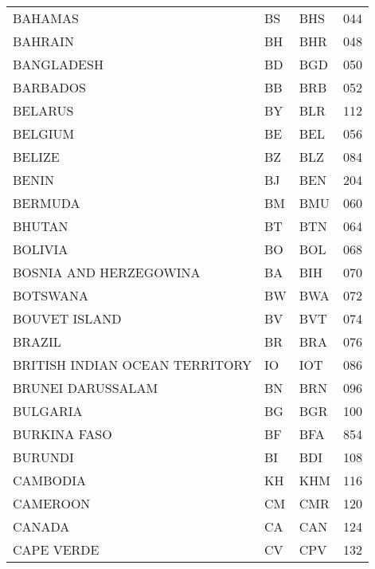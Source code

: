 \begin{footnotesize}
\begin{longtable}[c]{ p{} p{} p{} p{}}
    BAHAMAS                                        & BS & BHS & 044 \\
    BAHRAIN                                        & BH & BHR & 048 \\
    BANGLADESH                                     & BD & BGD & 050 \\
    BARBADOS                                       & BB & BRB & 052 \\
    BELARUS                                        & BY & BLR & 112 \\
    BELGIUM                                        & BE & BEL & 056 \\
    BELIZE                                         & BZ & BLZ & 084 \\
    BENIN                                          & BJ & BEN & 204 \\
    BERMUDA                                        & BM & BMU & 060 \\
    BHUTAN                                         & BT & BTN & 064 \\
    BOLIVIA                                        & BO & BOL & 068 \\
    BOSNIA AND HERZEGOWINA                         & BA & BIH & 070 \\
    BOTSWANA                                       & BW & BWA & 072 \\
    BOUVET ISLAND                                  & BV & BVT & 074 \\
    BRAZIL                                         & BR & BRA & 076 \\
    BRITISH INDIAN OCEAN TERRITORY                 & IO & IOT & 086 \\
    BRUNEI DARUSSALAM                              & BN & BRN & 096 \\
    BULGARIA                                       & BG & BGR & 100 \\
    BURKINA FASO                                   & BF & BFA & 854 \\
    BURUNDI                                        & BI & BDI & 108 \\
    CAMBODIA                                       & KH & KHM & 116 \\
    CAMEROON                                       & CM & CMR & 120 \\
    CANADA                                         & CA & CAN & 124 \\
    CAPE VERDE                                     & CV & CPV & 132 \\

\end{longtable}
\end{footnotesize}
